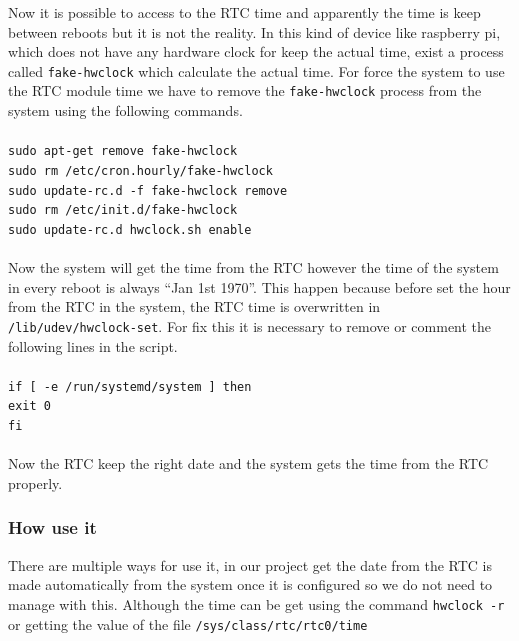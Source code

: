 			Now it is possible to access to the RTC time and apparently the time is keep between reboots but it is not the reality. In this kind of device like raspberry pi, which does not have any hardware clock for keep the actual time, exist a process called \texttt{fake-hwclock} which calculate the actual time.
			For force the system to use the RTC module time we have to remove the \texttt{fake-hwclock} process from the system using the following commands.\\\\
			\texttt{sudo apt-get remove fake-hwclock}\\
			\texttt{sudo rm /etc/cron.hourly/fake-hwclock}\\
			\texttt{sudo update-rc.d -f fake-hwclock remove}\\
			\texttt{sudo rm /etc/init.d/fake-hwclock}\\
			\texttt{sudo update-rc.d hwclock.sh enable}\\\\

			Now the system will get the time from the RTC however the time of the system in every reboot is always ``Jan 1st 1970''. This happen because before set the hour from the RTC in the system, the RTC time is overwritten in \texttt{/lib/udev/hwclock-set}. For fix this it is necessary to remove or comment the following lines in the script.\\\\
			\texttt{if [ -e /run/systemd/system ] \; then}\\
			\texttt{exit 0}\\
			\texttt{fi}\\\\

			Now the RTC keep the right date and the system gets the time from the RTC properly.

			\subsubsection{How use it} %
			There are multiple ways for use it, in our project get the date from the RTC is made automatically from the system once it is configured so we do not need to manage with this. Although the time can be get using the command \texttt{hwclock -r} or getting the value of the file \texttt{/sys/class/rtc/rtc0/time}

